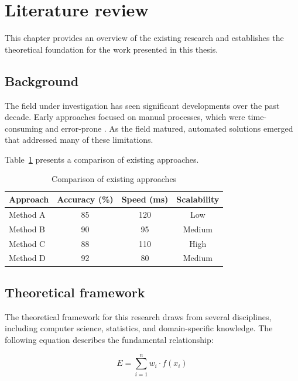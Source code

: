 \section{Literature review}

This chapter provides an overview of the existing research and establishes the theoretical foundation for the work presented in this thesis.

\subsection{Background}

The field under investigation has seen significant developments over the past decade.
Early approaches focused on manual processes, which were time-consuming and error-prone \cite{sample-design}.
As the field matured, automated solutions emerged that addressed many of these limitations.

Table~\ref{tab:comparison} presents a comparison of existing approaches.

\begin{table}[H]
    \caption{Comparison of existing approaches} \label{tab:comparison}
    \begin{tabular}{|l|c|c|c|}
    \hline \textbf{Approach} & \textbf{Accuracy (\%)} & \textbf{Speed (ms)} & \textbf{Scalability} \\
    \hline Method A & 85 & 120 & Low \\
    \hline Method B & 90 & 95  & Medium \\
    \hline Method C & 88 & 110 & High \\
    \hline Method D & 92 & 80  & Medium \\
    \hline
    \end{tabular}
\end{table}

\subsection{Theoretical framework}

The theoretical framework for this research draws from several disciplines, including computer science, statistics, and domain-specific knowledge.
The following equation describes the fundamental relationship:

\begin{equation} \label{eq:basic}
    E = \sum_{i=1}^{n} w_i \cdot f(x_i)
\end{equation}

